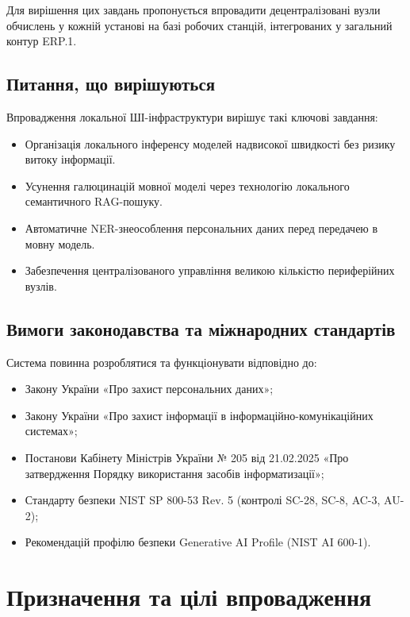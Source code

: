 \documentclass{article}
\begin{document}
Для вирішення цих завдань пропонується впровадити децентралізовані вузли обчислень у кожній установі
на базі робочих станцій, інтегрованих у загальний контур ERP.1.

\subsection{Питання, що вирішуються}

Впровадження локальної ШІ-інфраструктури вирішує такі ключові завдання:

\begin{itemize}
    \item Організація локального інференсу моделей надвисокої швидкості без ризику витоку інформації.
    \item Усунення галюцинацій мовної моделі через технологію локального семантичного RAG-пошуку.
    \item Автоматичне NER-знеособлення персональних даних перед передачею в мовну модель.
    \item Забезпечення централізованого управління великою кількістю периферійних вузлів.
\end{itemize}

\subsection{Вимоги законодавства та міжнародних стандартів}

Система повинна розроблятися та функціонувати відповідно до:

\begin{itemize}
    \item Закону України «Про захист персональних даних»;
    \item Закону України «Про захист інформації в інформаційно-комунікаційних системах»;
    \item Постанови Кабінету Міністрів України № 205 від 21.02.2025 «Про затвердження Порядку використання засобів інформатизації»;
    \item Стандарту безпеки NIST SP 800-53 Rev. 5 (контролі SC-28, SC-8, AC-3, AU-2);
    \item Рекомендацій профілю безпеки Generative AI Profile (NIST AI 600-1).
\end{itemize}

\section{Призначення та цілі впровадження}
\end{document}

